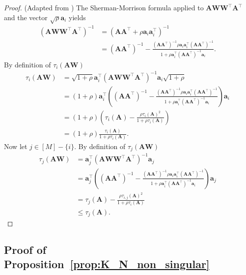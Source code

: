 \documentclass[twoside,11pt]{book}
\numberwithin{theorem}{chapter}
\numberwithin{definition}{chapter}
\numberwithin{proposition}{chapter}
\numberwithin{corollary}{chapter}
\numberwithin{example}{chapter}
\numberwithin{lemma}{chapter}
\DeclareMathOperator{\Tran}{\intercal}
\begin{document}
\begin{proof}(Adapted from \cite{Coh15})
The Sherman-Morrison formula applied to $\bm{A}\bm{W}\bm{W}^{\Tran}\bm{A}^{\Tran}$ and the vector $\sqrt{\rho} \bm{a}_{i}$ yields
\begin{align}
(\bm{A}\bm{W}\bm{W}^{\Tran}\bm{A}^{\Tran})^{-1} &  = (\bm{A}\bm{A}^{\Tran} + \rho \bm{a}_{i}\bm{a}_{i}^{\Tran})^{-1} \\
& = (\bm{A}\bm{A}^{\Tran})^{-1} - \frac{(\bm{A}\bm{A}^{\Tran})^{-1}\rho \bm{a}_{i}\bm{a}_{i}^{\Tran} (\bm{A}\bm{A}^{\Tran})^{-1}}{1+ \rho \bm{a}_{i}^{\Tran}(\bm{A}\bm{A}^{\Tran})^{-1}\bm{a}_{i}}.
\end{align}
By definition of $\tau_{i}(\bm{A}\bm{W})$
\begin{align}
\tau_{i}(\bm{A}\bm{W}) & = \sqrt{1 + \rho} \bm{a}_{i}^{\Tran}(\bm{A}\bm{W}\bm{W}^{\Tran}\bm{A}^{\Tran})^{-1}\bm{a}_{i}\sqrt{1 + \rho}\\
& = (1+\rho)\bm{a}_{i}^{\Tran} \left( (\bm{A}\bm{A}^{\Tran})^{-1} - \frac{(\bm{A}\bm{A}^{\Tran})^{-1}\rho \bm{a}_{i}\bm{a}_{i}^{\Tran} (\bm{A}\bm{A}^{\Tran})^{-1}}{1+ \rho \bm{a}_{i}^{\Tran}(\bm{A}\bm{A}^{\Tran})^{-1}\bm{a}_{i}} \right) \bm{a}_{i} \nonumber\\
& = (1+\rho) \left(\tau_{i}(\bm{A}) - \frac{\rho \tau_{i}(\bm{A})^{2}}{1+\rho \tau_{i}(\bm{A})} \right) \nonumber\\
& = (1+\rho)\frac{\tau_{i}(\bm{A})}{1+\rho \tau_{i}(\bm{A})} \nonumber.
\end{align}
Now let $j \in [M]-\{i\}$. By definition of $\tau_{j}(\bm{A}\bm{W})$
\begin{align}
\tau_{j}(\bm{A}\bm{W}) & =  \bm{a}_{j}^{\Tran}(\bm{A}\bm{W}\bm{W}^{\Tran}\bm{A}^{\Tran})^{-1}\bm{a}_{j}\\
& = \bm{a}_{j}^{\Tran} \left( (\bm{A}\bm{A}^{\Tran})^{-1} - \frac{(\bm{A}\bm{A}^{\Tran})^{-1}\rho \bm{a}_{i}\bm{a}_{i}^{\Tran} (\bm{A}\bm{A}^{\Tran})^{-1}}{1+ \rho \bm{a}_{i}^{\Tran}(\bm{A}\bm{A}^{\Tran})^{-1}\bm{a}_{i}} \right) \bm{a}_{j} \nonumber\\
& =  \tau_{j}(\bm{A}) - \frac{\rho \tau_{i,j}(\bm{A})^{2}}{1+\rho \tau_{i}(\bm{A})} \nonumber\\
& \leq \tau_{j}(\bm{A}) \nonumber.
\end{align}
\end{proof}


\subsection{Proof of Proposition~\ref{prop:K_N_non_singular}}\label{app:K_N_non_singular}
\end{document}
